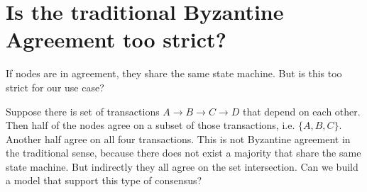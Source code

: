 \section{Is the traditional Byzantine Agreement too strict?}
If nodes are in agreement, they share the same state machine. But is this too
strict for our use case?

Suppose there is set of transactions $A \rightarrow B \rightarrow C \rightarrow
D$ that depend on each other. Then half of the nodes agree on a subset of those
transactions, i.e. $\{A, B, C\}$. Another half agree on all four transactions.
This is not Byzantine agreement in the traditional sense, because there does not
exist a majority that share the same state machine. But indirectly they all
agree on the set intersection. Can we build a model that support this type of
consensus?


